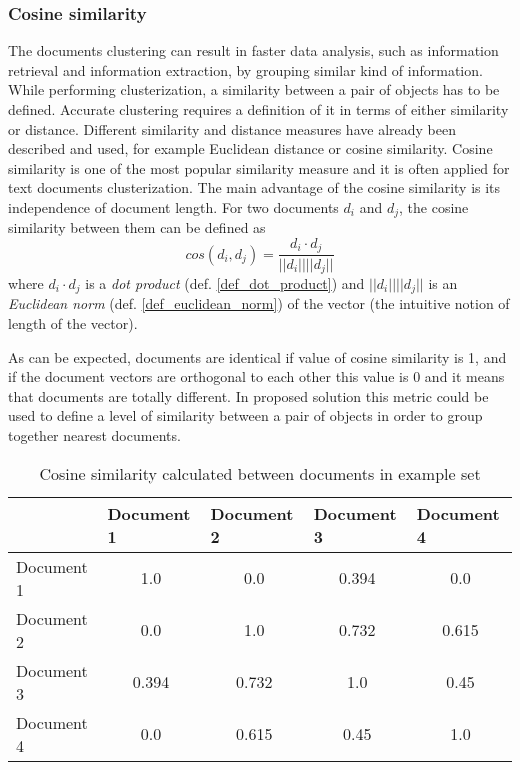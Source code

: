 \subsubsection{Cosine similarity}
 The documents clustering can result in faster data analysis, such  as  information retrieval  and  information  extraction,  by  grouping  similar kind  of  information. While performing clusterization, a similarity between a pair of objects has to be defined. Accurate clustering requires a definition of it in terms of either similarity or distance. Different similarity and distance measures have already been described and used, for example Euclidean  distance or cosine  similarity. Cosine  similarity  is  one  of  the  most  popular  similarity  measure and it is often  applied for  text  documents clusterization. The main advantage of the cosine similarity is its independence of document length. For two documents \(d_i\) and \(d_j\), the cosine similarity between them can be defined as
\[cos(d_i, d_j)=\frac{d_i \cdot d_j}{|| d_i || ||d_j ||} \]
where \(d_i \cdot d_j\) is a \textit{dot product} (def. \ref{def_dot_product}) and \(|| d_i || ||d_j ||\) is an \textit{Euclidean norm} (def. \ref{def_euclidean_norm}) of the vector (the intuitive notion of length of the vector).

As can be expected, documents are identical if value of cosine similarity is 1, and if the 
document vectors are orthogonal to each other this value is 0 and it means that documents are totally different.
In proposed solution this metric could be used to define a level of similarity between a pair of objects in order to group together nearest documents.

\begin{table}[H]
	\centering
	\caption{Cosine similarity calculated between documents in example set}
	\label{casine_similarity}
	\begin{tabular}{@{}lcccc@{}}
		\toprule
		& \multicolumn{1}{l}{Document 1} & \multicolumn{1}{l}{Document 2} & \multicolumn{1}{l}{Document 3} & \multicolumn{1}{l}{Document 4} \\ \midrule
		Document 1 & 1.0                            & 0.0                            & 0.394                          & 0.0                            \\
		Document 2 & 0.0                            & 1.0                            & 0.732                          & 0.615                          \\
		Document 3 & 0.394                          & 0.732                          & 1.0                            & 0.45                           \\
		Document 4 & 0.0                            & 0.615                          & 0.45                           & 1.0                            \\ \bottomrule
	\end{tabular}
\end{table}


